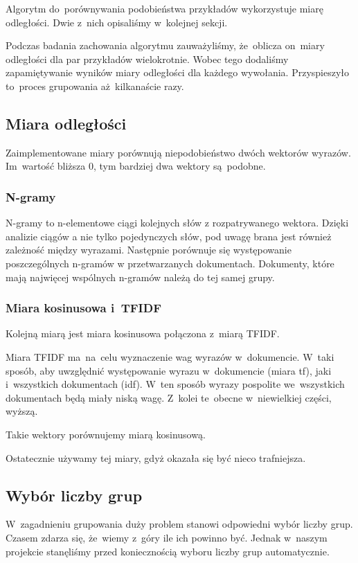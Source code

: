 \documentclass[a4paper,12pt]{mwart}
\begin{document}
Algorytm do~porównywania podobieństwa przykładów wykorzystuje miarę odległości.
Dwie z~nich opisaliśmy w~kolejnej sekcji.

Podczas badania zachowania algorytmu zauważyliśmy, że~oblicza on~miary
odległości dla par przykładów wielokrotnie. Wobec tego dodaliśmy zapamiętywanie
wyników miary odległości dla każdego wywołania. Przyspieszyło to~proces
grupowania aż~kilkanaście razy.

\subsection{Miara odległości}

Zaimplementowane miary porównują niepodobieństwo dwóch wektorów wyrazów.
Im~wartość bliższa 0, tym bardziej dwa wektory są~podobne.

\subsubsection{N-gramy}
N-gramy to n-elementowe ciągi kolejnych słów z rozpatrywanego wektora. Dzięki
analizie ciągów a nie tylko pojedynczych słów, pod uwagę brana jest również
zależność między wyrazami. Następnie porównuje się występowanie poszczególnych
n-gramów w przetwarzanych dokumentach. Dokumenty, które mają najwięcej wspólnych
n-gramów należą do tej samej grupy.

\subsubsection{Miara kosinusowa i~TFIDF}

Kolejną miarą jest miara kosinusowa połączona z~miarą TFIDF.

Miara TFIDF ma~na~celu wyznaczenie wag wyrazów w~dokumencie. W~taki sposób, aby
uwzględnić występowanie wyrazu w~dokumencie (miara tf), jaki i~wszystkich
dokumentach (idf). W~ten sposób wyrazy pospolite we~wszystkich dokumentach będą
miały niską wagę. Z~kolei te~obecne w~niewielkiej części, wyższą.

Takie wektory porównujemy miarą kosinusową.

Ostatecznie używamy tej miary, gdyż okazała się być nieco trafniejsza.

\subsection{Wybór liczby grup}

W~zagadnieniu grupowania duży problem stanowi odpowiedni wybór liczby grup.
Czasem zdarza się, że~wiemy z~góry ile ich powinno być. Jednak w~naszym
projekcie stanęliśmy przed koniecznością wyboru liczby grup automatycznie.
\end{document}
